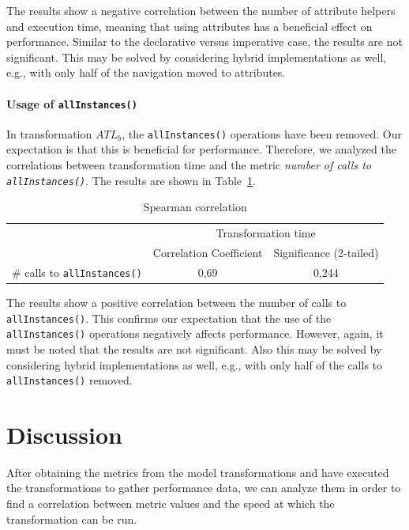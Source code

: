 \documentclass[12pt]{elsarticle}
\begin{document}
The results show a negative correlation between the number of attribute helpers
and execution time, meaning that using attributes has a beneficial effect on
performance. Similar to the declarative versus imperative case, the results are
not significant. This may be solved by considering hybrid implementations as
well, e.g., with only half of the navigation moved to attributes.


\paragraph{Usage of \texttt{allInstances()}}
In transformation $ATL_b$, the \texttt{allInstances()} operations have been removed.
Our expectation is that this is beneficial for performance.
Therefore, we analyzed the correlations between transformation time and the
metric \emph{number of calls to \texttt{allInstances()}}. The results are shown
in Table~\ref{tab:cor:allInst}.\\

\begin{table}[hbt]
\centering\small
\begin{tabular}{|l|c|c|}
\cline{2-3}
\multicolumn{1}{c|}{}               & \multicolumn{2}{c|}{Transformation time}          \\
\cline{2-3}
\multicolumn{1}{c|}{}               & Correlation Coefficient & Significance (2-tailed) \\
\hline
\# calls to \texttt{allInstances()} & 0,69 & 0,244  \\
\hline
\end{tabular}
\normalsize
\caption{Spearman correlation}
\label{tab:cor:allInst}
\end{table}

The results show a positive correlation between the number of calls to
\texttt{allInstances()}. This confirms our expectation that the use of the
\texttt{allInstances()} operations negatively affects performance. However,
again, it must be noted that the results are not significant. Also this may be
solved by considering hybrid implementations as well, e.g., with only half of
the calls to \texttt{allInstances()} removed.


\section{Discussion}\label{sec:discussion}

After obtaining the metrics from the model transformations and have
executed the transformations to gather performance data, we can analyze them in
order to find a correlation between metric values and the speed at which the
transformation can be run.
\end{document}
